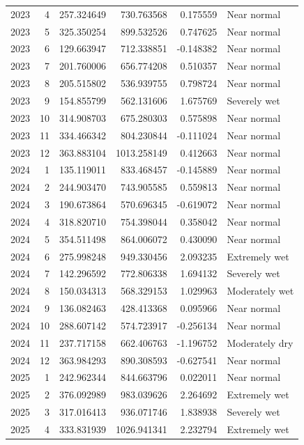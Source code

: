 \begin{tabular}{rrrrrl}
2023 & 4 & 257.324649 & 730.763568 & 0.175559 & Near normal \\
2023 & 5 & 325.350254 & 899.532526 & 0.747625 & Near normal \\
2023 & 6 & 129.663947 & 712.338851 & -0.148382 & Near normal \\
2023 & 7 & 201.760006 & 656.774208 & 0.510357 & Near normal \\
2023 & 8 & 205.515802 & 536.939755 & 0.798724 & Near normal \\
2023 & 9 & 154.855799 & 562.131606 & 1.675769 & Severely wet \\
2023 & 10 & 314.908703 & 675.280303 & 0.575898 & Near normal \\
2023 & 11 & 334.466342 & 804.230844 & -0.111024 & Near normal \\
2023 & 12 & 363.883104 & 1013.258149 & 0.412663 & Near normal \\
2024 & 1 & 135.119011 & 833.468457 & -0.145889 & Near normal \\
2024 & 2 & 244.903470 & 743.905585 & 0.559813 & Near normal \\
2024 & 3 & 190.673864 & 570.696345 & -0.619072 & Near normal \\
2024 & 4 & 318.820710 & 754.398044 & 0.358042 & Near normal \\
2024 & 5 & 354.511498 & 864.006072 & 0.430090 & Near normal \\
2024 & 6 & 275.998248 & 949.330456 & 2.093235 & Extremely wet \\
2024 & 7 & 142.296592 & 772.806338 & 1.694132 & Severely wet \\
2024 & 8 & 150.034313 & 568.329153 & 1.029963 & Moderately wet \\
2024 & 9 & 136.082463 & 428.413368 & 0.095966 & Near normal \\
2024 & 10 & 288.607142 & 574.723917 & -0.256134 & Near normal \\
2024 & 11 & 237.717158 & 662.406763 & -1.196752 & Moderately dry \\
2024 & 12 & 363.984293 & 890.308593 & -0.627541 & Near normal \\
2025 & 1 & 242.962344 & 844.663796 & 0.022011 & Near normal \\
2025 & 2 & 376.092989 & 983.039626 & 2.264692 & Extremely wet \\
2025 & 3 & 317.016413 & 936.071746 & 1.838938 & Severely wet \\
2025 & 4 & 333.831939 & 1026.941341 & 2.232794 & Extremely wet \\

\end{tabular}

